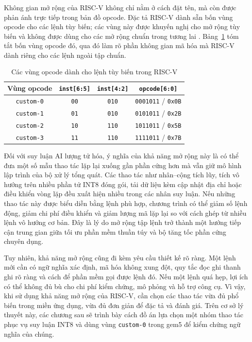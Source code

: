 \documentclass[../DoAn.tex]{subfiles}
\begin{document}
Không gian mở rộng của RISC-V không chỉ nằm ở cách đặt tên, mà còn được phản ánh trực tiếp trong bản đồ opcode. Đặc tả RISC-V dành sẵn bốn vùng opcode cho các lệnh tùy biến; các vùng này được khuyến nghị cho mở rộng tùy biến và không được dùng cho các mở rộng chuẩn trong tương lai \cite{riscv_unpriv_2026}. Bảng~\ref{tab:riscv-custom-opcode} tóm tắt bốn vùng opcode đó, qua đó làm rõ phần không gian mã hóa mà RISC-V dành riêng cho các lệnh ngoài tập chuẩn.

\begin{table}[H]
    \centering
    \begin{tabular}{|c|c|c|c|}
        \hline
        Vùng opcode & \texttt{inst[6:5]} & \texttt{inst[4:2]} & \texttt{opcode[6:0]} \\
        \hline
        \texttt{custom-0} & \texttt{00} & \texttt{010} & \texttt{0001011} / \texttt{0x0B} \\
        \hline
        \texttt{custom-1} & \texttt{01} & \texttt{010} & \texttt{0101011} / \texttt{0x2B} \\
        \hline
        \texttt{custom-2} & \texttt{10} & \texttt{110} & \texttt{1011011} / \texttt{0x5B} \\
        \hline
        \texttt{custom-3} & \texttt{11} & \texttt{110} & \texttt{1111011} / \texttt{0x7B} \\
        \hline
    \end{tabular}
    \caption{Các vùng opcode dành cho lệnh tùy biến trong RISC-V}
    \label{tab:riscv-custom-opcode}
\end{table}

Đối với suy luận AI lượng tử hóa, ý nghĩa của khả năng mở rộng này là có thể đưa một số mẫu thao tác lặp lại xuống gần phần cứng hơn mà vẫn giữ mô hình lập trình của bộ xử lý tổng quát. Các thao tác như nhân--cộng tích lũy, tích vô hướng trên nhiều phần tử INT8 đóng gói, tải dữ liệu kèm cập nhật địa chỉ hoặc điều khiển vòng lặp đều xuất hiện nhiều trong các nhân suy luận. Nếu những thao tác này được biểu diễn bằng lệnh phù hợp, chương trình có thể giảm số lệnh động, giảm chi phí điều khiển và giảm lượng mã lặp lại so với cách ghép từ nhiều lệnh vô hướng cơ bản. Đây là lý do mở rộng tập lệnh trở thành một hướng tiếp cận trung gian giữa tối ưu phần mềm thuần túy và bộ tăng tốc phần cứng chuyên dụng.

Tuy nhiên, khả năng mở rộng cũng đi kèm yêu cầu thiết kế rõ ràng. Một lệnh mới cần có ngữ nghĩa xác định, mã hóa không xung đột, quy tắc đọc ghi thanh ghi rõ ràng và cách để phần mềm gọi được lệnh đó. Nếu một lệnh quá hẹp, lợi ích có thể không đủ bù cho chi phí kiểm chứng, mô phỏng và hỗ trợ công cụ. Vì vậy, khi sử dụng khả năng mở rộng của RISC-V, cần chọn các thao tác vừa đủ phổ biến trong miền ứng dụng, vừa đủ đơn giản để đặc tả và đánh giá. Trên cơ sở lý thuyết này, các chương sau sẽ trình bày cách đồ án lựa chọn một nhóm thao tác phục vụ suy luận INT8 và dùng vùng \texttt{custom-0} trong gem5 để kiểm chứng ngữ nghĩa của chúng.
\end{document}
